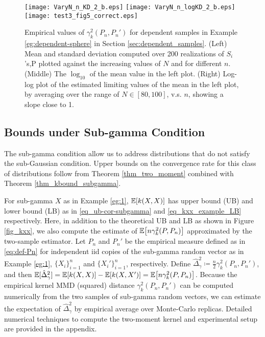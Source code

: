 \documentclass{article}
\theoremstyle{definition}
\newcommand{\bEx}{\ensuremath{\mathbb{E}}}
\newcommand{\ex}[1]{\ensuremath{\mathbb{E}\left[ #1\right]}}
\newcommand{\cT}{\mathcal{T}}
\newcommand{\appnamesmall}{appendix}
\newcommand{\appnamesmall}{supplementary materials}
\let\originalleft\left
\let\originalright\right
\renewcommand{\left}{\mathopen{}\mathclose\bgroup\originalleft}
\renewcommand{\right}{\aftergroup\egroup\originalright}
\begin{document}

\begin{figure*}[t]
\centering
   \texttt{[image: VaryN\_n\_KD\_2\_b.eps]}
        \texttt{[image: VaryN\_n\_logKD\_2\_b.eps]}
                \texttt{[image: test3\_fig5\_correct.eps]}
    \caption{ \small
  Empirical values of $\gamma_k^2 (P_n, P_n')$ 
    for dependent samples in Example \ref{eg:dependent-sphere} in Section \ref{sec:dependent_samples}.
    (Left) Mean and standard deviation computed over 200 realizations of $S_i$'s,P
    plotted against the increasing values of $N$ and for different $n$.
    (Middle)  The $\log_{10}$ of the mean value in the left plot. 
    (Right) Log-log plot of the estimated limiting values of the mean in the left plot,
    by averaging over the range of $N \in [80, 100]$,
    v.s. $n$, showing a slope close to 1.
       \label{fig:exp2}
       }
       \vspace{-5pt}
\end{figure*}


\subsection{Bounds under Sub-gamma Condition}\label{subsec_exp-sub-gamma}


The sub-gamma condition allow us to address distributions that do not satisfy the  sub-Gaussian condition. Upper bounds on the convergence rate for this class of distributions follow from Theorem \ref{thm_two_moment}
combined with Theorem \ref{thm_kbound_subgamma}. 

For sub-gamma  $X$ as in  Example \ref{eg:1}, $\ex{ k(X,X)}$ has upper bound  (UB)  and lower bound (LB) as in \eqref{eq_ub-cor-subgamma}  and \eqref{eq_kxx_example_LB}  respectively.
Here, in addition to the theoretical UB and LB as shown in Figure \ref{fig_kxx},
we  also compute the estimate of 
$\ex { n \gamma_k^2( P, P_n) }$  approximated by the two-sample estimator. 
Let $P_n$ and $P_n'$ be the empirical measure defined as in \eqref{eq:def-Pn} for independent iid copies of the sub-gamma random vector as in Example \ref{eg:1},
 $\{X_i \}_{i=1}^n$ and $\{X_i' \}_{i=1}^n$,
  respectively.
Define
$\hat{\Delta}_\gamma^2 \coloneqq \frac{n}{2} \gamma_k^2( {P}_n, {P}_n')$,
and then 
$ \bEx [\hat{\Delta}_\gamma^2]  =\ex{k(X,X)} -  \ex{k(X,X')} = \ex{  n \gamma_k^2( P, P_n) }$. Because the empirical kernel MMD (squared) distance
$\gamma_k^2( P_n, P_n')$ can be computed numerically from the two samples of sub-gamma random vectors, we can estimate the   expectation of $\hat{\Delta}_\gamma^2$ by empirical average over Monte-Carlo replicas.
Detailed numerical techniques to compute the two-moment kernel and experimental setup are provided in the \appnamesmall. 
\end{document}
